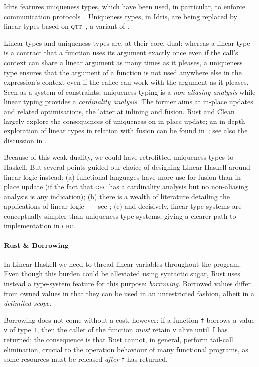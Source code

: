 \documentclass[acmsmall,screen]{acmart}\settopmatter{}
\newcommand\HaskeLL{Linear Haskell\xspace{}}
\begin{document}
Idris \cite{brady_idris_2013} features uniqueness types, which have
been used, in particular, to enforce communication
protocols~\cite{brady_uniqueness_2017}. Uniqueness types, in Idris,
are being replaced by linear types based on
\textsc{qtt}~\cite{atkey_qtt_2017}, a variant of
\citet{mcbride_rig_2016}.

Linear types and uniqueness types are, at their core, dual: whereas a linear type is
a contract that a function uses its argument exactly once
even if the call's context can share a linear argument as many times as it
pleases, a uniqueness type ensures that the argument of a function is
not used anywhere else in the expression's context even if the callee
can work with the argument as it pleases.
%
Seen as a system of constraints, uniqueness typing is a {\em non-aliasing
analysis} while linear typing provides a {\em cardinality analysis}. The
former aims at in-place updates and related optimisations, the latter
at inlining and fusion. Rust and Clean largely explore the
consequences of uniqueness on in-place update; an in-depth exploration
of linear types in relation with fusion can be found
in~\citet{bernardy_composable_2015};
see also the discussion in .

Because of this weak duality, we could have
retrofitted uniqueness types to Haskell. But several points
guided our choice of designing \HaskeLL{} around linear
logic instead: (a) functional languages have more use
for fusion than in-place update (if the fact that \textsc{ghc} has a cardinality
analysis but no non-aliasing analysis is any indication); (b) there is a
wealth of literature detailing the applications of linear
logic — see ; (c) and decisively, linear type systems are
conceptually simpler than uniqueness type systems, giving a
clearer path to implementation in \textsc{ghc}.

\paragraph{Rust \& Borrowing}

In \HaskeLL{} we need to thread linear variables throughout the
program.  Even
though this burden could be alleviated using syntactic sugar, Rust uses
instead a type-system feature for this purpose: \emph{borrowing}.
Borrowed values differ from owned values in that they can
be used in an unrestricted fashion, albeit in a \emph{delimited
  scope}.

Borrowing does not come without a cost, however: if a
function \texttt{f} borrows a value \texttt{v} of type \texttt{T},
then the caller of the function \emph{must} retain \texttt{v} alive
until \texttt{f} has returned; the consequence is that Rust cannot, in
general, perform tail-call elimination, crucial to the operation
behaviour of many functional programs, as some resources must be
released \emph{after} \texttt{f} has returned.
\end{document}
